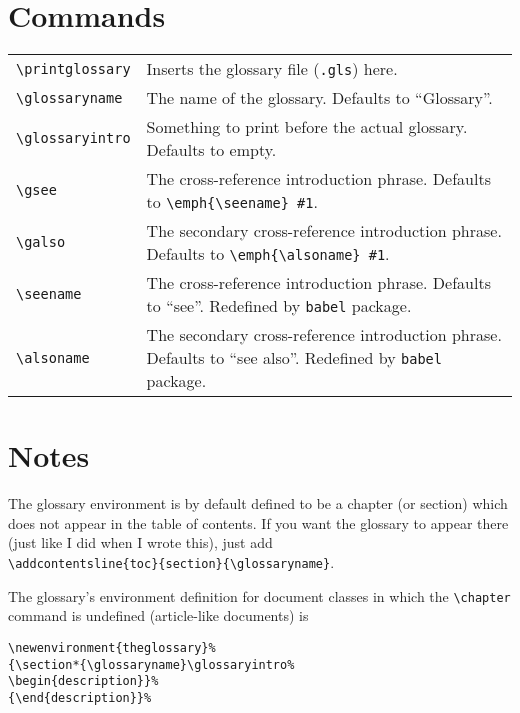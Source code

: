 \documentclass[a4paper]{article}
\begin{document}
\section{Commands}

\begin{tabular}{lp{}}
\verb+\printglossary+ & Inserts the glossary file ({\tt *.gls}) here. \\
\verb+\glossaryname+ & The name of the glossary. Defaults to ``Glossary''.\\
\verb+\glossaryintro+ & Something to print before the actual glossary.
Defaults to empty. \\
\verb+\gsee+ & The cross-reference introduction phrase.
Defaults to \verb+\emph{\seename} #1+. \\
\verb+\galso+ & The secondary cross-reference introduction phrase.
Defaults to \verb+\emph{\alsoname} #1+. \\
\verb+\seename+ & The cross-reference introduction phrase.
Defaults to ``see''. Redefined by \verb+babel+ package.\\
\verb+\alsoname+ & The secondary cross-reference introduction phrase.
Defaults to ``see also''. Redefined by \verb+babel+ package.\\
\end{tabular}


\section{Notes}

The glossary environment is by default defined to be a chapter (or section)
which does not appear in the table of contents. If you want the glossary to
appear there (just like I did when I wrote this), just add \\
\verb+\addcontentsline{toc}{section}{\glossaryname}+.

The glossary's environment definition for document classes in which the
\verb+\chapter+ command is undefined (article-like documents) is 
\begin{verbatim}
\newenvironment{theglossary}%
{\section*{\glossaryname}\glossaryintro%
\begin{description}}%
{\end{description}}%
\end{verbatim}
\end{document}

